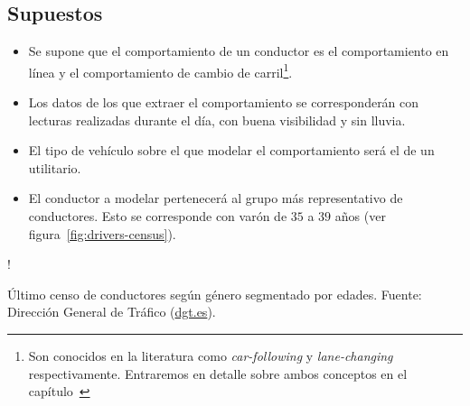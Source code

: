 \subsection{Supuestos}

\begin{itemize}
	\item Se supone que el comportamiento de un conductor es el comportamiento en línea y el comportamiento de cambio de carril\footnote{Son conocidos en la literatura como \textit{car-following} y \textit{lane-changing} respectivamente. Entraremos en detalle sobre ambos conceptos en el capítulo~}.
	\item Los datos de los que extraer el comportamiento se corresponderán con lecturas realizadas durante el día, con buena visibilidad y sin lluvia.
	\item El tipo de vehículo sobre el que modelar el comportamiento será el de un utilitario.
	\item El conductor a modelar pertenecerá al grupo más representativo de conductores. Esto se corresponde con varón de $35$ a $39$ años (ver figura~\ref{fig:drivers-census}).
\end{itemize}

\begin{marginfigure}
	\resizebox {\linewidth} {!} {
	}
	\caption{Último censo de conductores según género segmentado por edades. Fuente: Dirección General de Tráfico (\url{dgt.es}).}
	\label{fig:drivers-census}
\end{marginfigure}
